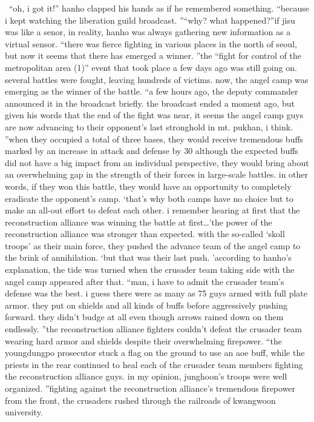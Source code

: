  “oh, i got it!” hanho clapped his hands as if he remembered something.
 “because i kept watching the liberation guild broadcast.
”“why? what happened?”if jisu was like a senor, in reality, hanho was always gathering new information as a virtual sensor.
“there was fierce fighting in various places in the north of seoul, but now it seems that there has emerged a winner.
”the “fight for control of the metropolitan area (1)” event that took place a few days ago was still going on.
 several battles were fought, leaving hundreds of victims.
 now, the angel camp was emerging as the winner of the battle.
“a few hours ago, the deputy commander announced it in the broadcast briefly.
 the broadcast ended a moment ago, but given his words that the end of the fight was near, it seems the angel camp guys are now advancing to their opponent’s last stronghold in mt.
 pukhan, i think.
”when they occupied a total of three bases, they would receive tremendous buffs marked by an increase in attack and defense by 30%
although the expected buffs did not have a big impact from an individual perspective, they would bring about an overwhelming gap in the strength of their forces in large-scale battles.
in other words, if they won this battle, they would have an opportunity to completely eradicate the opponent’s camp.
‘that’s why both camps have no choice but to make an all-out effort to defeat each other.
 i remember hearing at first that the reconstruction alliance was winning the battle at first…’the power of the reconstruction alliance was stronger than expected.
 with the so-called ‘skoll troops’ as their main force, they pushed the advance team of the angel camp to the brink of annihilation.
‘but that was their last push.
’according to hanho’s explanation, the tide was turned when the crusader team taking side with the angel camp appeared after that.
“man, i have to admit the crusader team’s defense was the best.
 i guess there were as many as 75 guys armed with full plate armor.
 they put on shields and all kinds of buffs before aggressively pushing forward.
 they didn’t budge at all even though arrows rained down on them endlessly.
”the reconstruction alliance fighters couldn’t defeat the crusader team wearing hard armor and shields despite their overwhelming firepower.
“the youngdungpo prosecutor stuck a flag on the ground to use an aoe buff, while the priests in the rear continued to heal each of the crusader team members fighting the reconstruction alliance guys.
 in my opinion, junghoon’s troops were well organized.
”fighting against the reconstruction alliance’s tremendous firepower from the front, the crusaders rushed through the railroads of kwangwoon university.
